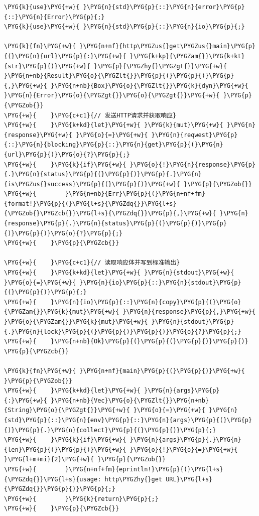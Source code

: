 \begin{Verbatim}[commandchars=\\\{\},breaklines=true,breakanywhere=true,fontsize=\codefont,xleftmargin=17bp]
\PYG{k}{use}\PYG{+w}{ }\PYG{n}{std}\PYG{p}{::}\PYG{n}{error}\PYG{p}{::}\PYG{n}{Error}\PYG{p}{;}
\PYG{k}{use}\PYG{+w}{ }\PYG{n}{std}\PYG{p}{::}\PYG{n}{io}\PYG{p}{;}

\PYG{k}{fn}\PYG{+w}{ }\PYG{n+nf}{http\PYGZus{}get\PYGZus{}main}\PYG{p}{(}\PYG{n}{url}\PYG{p}{:}\PYG{+w}{ }\PYG{k+kp}{\PYGZam{}}\PYG{k+kt}{str}\PYG{p}{)}\PYG{+w}{ }\PYG{p}{\PYGZhy{}\PYGZgt{}}\PYG{+w}{ }\PYG{n+nb}{Result}\PYG{o}{\PYGZlt{}}\PYG{p}{(}\PYG{p}{)}\PYG{p}{,}\PYG{+w}{ }\PYG{n+nb}{Box}\PYG{o}{\PYGZlt{}}\PYG{k}{dyn}\PYG{+w}{ }\PYG{n}{Error}\PYG{o}{\PYGZgt{}}\PYG{o}{\PYGZgt{}}\PYG{+w}{ }\PYG{p}{\PYGZob{}}
\PYG{+w}{    }\PYG{c+c1}{// 发送HTTP请求并获取响应}
\PYG{+w}{    }\PYG{k+kd}{let}\PYG{+w}{ }\PYG{k}{mut}\PYG{+w}{ }\PYG{n}{response}\PYG{+w}{ }\PYG{o}{=}\PYG{+w}{ }\PYG{n}{reqwest}\PYG{p}{::}\PYG{n}{blocking}\PYG{p}{::}\PYG{n}{get}\PYG{p}{(}\PYG{n}{url}\PYG{p}{)}\PYG{o}{?}\PYG{p}{;}
\PYG{+w}{    }\PYG{k}{if}\PYG{+w}{ }\PYG{o}{!}\PYG{n}{response}\PYG{p}{.}\PYG{n}{status}\PYG{p}{(}\PYG{p}{)}\PYG{p}{.}\PYG{n}{is\PYGZus{}success}\PYG{p}{(}\PYG{p}{)}\PYG{+w}{ }\PYG{p}{\PYGZob{}}
\PYG{+w}{        }\PYG{n+nb}{Err}\PYG{p}{(}\PYG{n+nf+fm}{format!}\PYG{p}{(}\PYG{l+s}{\PYGZdq{}}\PYG{l+s}{\PYGZob{}\PYGZcb{}}\PYG{l+s}{\PYGZdq{}}\PYG{p}{,}\PYG{+w}{ }\PYG{n}{response}\PYG{p}{.}\PYG{n}{status}\PYG{p}{(}\PYG{p}{)}\PYG{p}{)}\PYG{p}{)}\PYG{o}{?}\PYG{p}{;}
\PYG{+w}{    }\PYG{p}{\PYGZcb{}}

\PYG{+w}{    }\PYG{c+c1}{// 读取响应体并写到标准输出}
\PYG{+w}{    }\PYG{k+kd}{let}\PYG{+w}{ }\PYG{n}{stdout}\PYG{+w}{ }\PYG{o}{=}\PYG{+w}{ }\PYG{n}{io}\PYG{p}{::}\PYG{n}{stdout}\PYG{p}{(}\PYG{p}{)}\PYG{p}{;}
\PYG{+w}{    }\PYG{n}{io}\PYG{p}{::}\PYG{n}{copy}\PYG{p}{(}\PYG{o}{\PYGZam{}}\PYG{k}{mut}\PYG{+w}{ }\PYG{n}{response}\PYG{p}{,}\PYG{+w}{ }\PYG{o}{\PYGZam{}}\PYG{k}{mut}\PYG{+w}{ }\PYG{n}{stdout}\PYG{p}{.}\PYG{n}{lock}\PYG{p}{(}\PYG{p}{)}\PYG{p}{)}\PYG{o}{?}\PYG{p}{;}
\PYG{+w}{    }\PYG{n+nb}{Ok}\PYG{p}{(}\PYG{p}{(}\PYG{p}{)}\PYG{p}{)}
\PYG{p}{\PYGZcb{}}

\PYG{k}{fn}\PYG{+w}{ }\PYG{n+nf}{main}\PYG{p}{(}\PYG{p}{)}\PYG{+w}{ }\PYG{p}{\PYGZob{}}
\PYG{+w}{    }\PYG{k+kd}{let}\PYG{+w}{ }\PYG{n}{args}\PYG{p}{:}\PYG{+w}{ }\PYG{n+nb}{Vec}\PYG{o}{\PYGZlt{}}\PYG{n+nb}{String}\PYG{o}{\PYGZgt{}}\PYG{+w}{ }\PYG{o}{=}\PYG{+w}{ }\PYG{n}{std}\PYG{p}{::}\PYG{n}{env}\PYG{p}{::}\PYG{n}{args}\PYG{p}{(}\PYG{p}{)}\PYG{p}{.}\PYG{n}{collect}\PYG{p}{(}\PYG{p}{)}\PYG{p}{;}
\PYG{+w}{    }\PYG{k}{if}\PYG{+w}{ }\PYG{n}{args}\PYG{p}{.}\PYG{n}{len}\PYG{p}{(}\PYG{p}{)}\PYG{+w}{ }\PYG{o}{!}\PYG{o}{=}\PYG{+w}{ }\PYG{l+m+mi}{2}\PYG{+w}{ }\PYG{p}{\PYGZob{}}
\PYG{+w}{        }\PYG{n+nf+fm}{eprintln!}\PYG{p}{(}\PYG{l+s}{\PYGZdq{}}\PYG{l+s}{usage: http\PYGZhy{}get URL}\PYG{l+s}{\PYGZdq{}}\PYG{p}{)}\PYG{p}{;}
\PYG{+w}{        }\PYG{k}{return}\PYG{p}{;}
\PYG{+w}{    }\PYG{p}{\PYGZcb{}}


\end{Verbatim}
